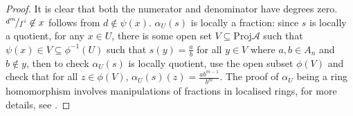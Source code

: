 \documentclass[a4paper,UKenglish,cleveref, autoref, thm-restate]{lipics-v2021}
\begin{document}
\begin{proof}
    It is clear that both the numerator and denominator have degrees zero. $\nicefrac{d^m}{f^i}\not\in x$ follows from $d\not\in\psi(x)$.
    $\alpha_U(s)$ is locally a fraction: since $s$ is locally a quotient, for any $x\in U$, there is some open set $V\subseteq \mathrm{Proj}\mathcal{A}$ such that $\psi(x)\in V\subseteq \phi^{-1}(U)$ such that $s(y)=\frac a b$ for all $y\in V$ where $a,b\in A_n$ and $b\not\in y$, then to check $\alpha_U(s)$ is locally quotient, use the open subset $\phi(V)$ and check that for all $z\in \phi(V)$, $\alpha_U(s)(z)=\frac{ab^{m-1}}{b^m}$. The proof of $\alpha_U$ being a ring homomorphism involves manipulations of fractions in localised rings, for more details, see . %
        
\end{proof}
\end{document}
